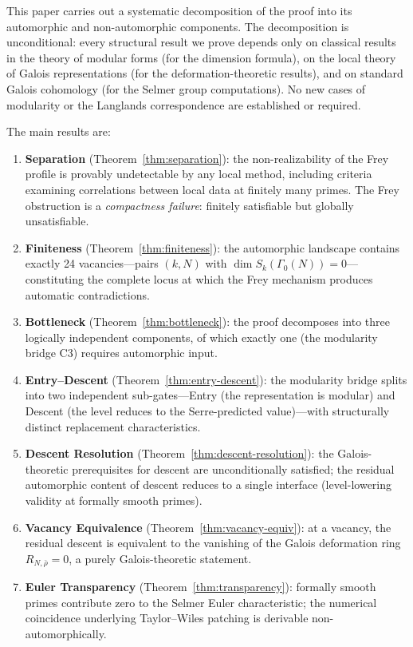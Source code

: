 \documentclass[12pt]{amsart}
\theoremstyle{definition}
\theoremstyle{remark}
\newcommand{\rhobar}{\bar{\rho}}
\begin{document}
This paper carries out a systematic decomposition of the proof into its automorphic and non-automorphic components. The decomposition is unconditional: every structural result we prove depends only on classical results in the theory of modular forms (for the dimension formula), on the local theory of Galois representations (for the deformation-theoretic results), and on standard Galois cohomology (for the Selmer group computations). No new cases of modularity or the Langlands correspondence are established or required.

The main results are:

\begin{enumerate}[label=(\roman*)]
\item \textbf{Separation} (Theorem~\ref{thm:separation}): the non-realizability of the Frey profile is provably undetectable by any local method, including criteria examining correlations between local data at finitely many primes. The Frey obstruction is a \emph{compactness failure}: finitely satisfiable but globally unsatisfiable.

\item \textbf{Finiteness} (Theorem~\ref{thm:finiteness}): the automorphic landscape contains exactly 24 vacancies---pairs $(k, N)$ with $\dim S_k(\Gamma_0(N)) = 0$---constituting the complete locus at which the Frey mechanism produces automatic contradictions.

\item \textbf{Bottleneck} (Theorem~\ref{thm:bottleneck}): the proof decomposes into three logically independent components, of which exactly one (the modularity bridge C3) requires automorphic input.

\item \textbf{Entry--Descent} (Theorem~\ref{thm:entry-descent}): the modularity bridge splits into two independent sub-gates---Entry (the representation is modular) and Descent (the level reduces to the Serre-predicted value)---with structurally distinct replacement characteristics.

\item \textbf{Descent Resolution} (Theorem~\ref{thm:descent-resolution}): the Galois-theoretic prerequisites for descent are unconditionally satisfied; the residual automorphic content of descent reduces to a single interface (level-lowering validity at formally smooth primes).

\item \textbf{Vacancy Equivalence} (Theorem~\ref{thm:vacancy-equiv}): at a vacancy, the residual descent is equivalent to the vanishing of the Galois deformation ring $R_{N,\rhobar} = 0$, a purely Galois-theoretic statement.

\item \textbf{Euler Transparency} (Theorem~\ref{thm:transparency}): formally smooth primes contribute zero to the Selmer Euler characteristic; the numerical coincidence underlying Taylor--Wiles patching is derivable non-automorphically.
\end{enumerate}
\end{document}
